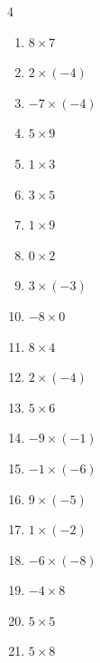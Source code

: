 \begin{multicols}{4}
\begin{enumerate}
  \item $8\times 7$
        \phantom{$=56$}

  \item $2\times (-4)$
        \phantom{$=-8$}

  \item $-7\times (-4)$
        \phantom{$=28$}

  \item $5\times 9$
        \phantom{$=45$}

  \item $1\times 3$
        \phantom{$=3$}

\columnbreak %

  \item $3\times 5$
        \phantom{$=15$}

  \item $1\times 9$
        \phantom{$=9$}

  \item $0\times 2$
        \phantom{$=0$}

  \item $3\times (-3)$
        \phantom{$=-9$}

  \item $-8\times 0$
        \phantom{$=0$}

  \item $8\times 4$
        \phantom{$=32$}

  \item $2\times (-4)$
        \phantom{$=-8$}

  \item $5\times 6$
        \phantom{$=30$}

  \item $-9\times (-1)$
        \phantom{$=9$}

  \item $-1\times (-6)$
        \phantom{$=6$}

  \item $9\times (-5)$
        \phantom{$=-45$}

  \item $1\times (-2)$
        \phantom{$=-2$}

  \item $-6\times (-8)$
        \phantom{$=48$}

  \item $-4\times 8$
        \phantom{$=-32$}

  \item $5\times 5$
        \phantom{$=25$}

  \item $5\times 8$
        \phantom{$=40$}


\end{enumerate}
\end{multicols}

